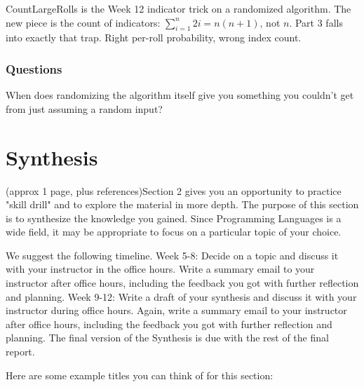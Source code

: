 \documentclass{article}
\theoremstyle{theorem}
\theoremstyle{definition}
\theoremstyle{remark}
\begin{document}
CountLargeRolls is the Week 12 indicator trick on a randomized algorithm. The new piece is the count of indicators: $\sum_{i=1}^{n} 2i = n(n+1)$, not $n$. Part 3 falls into exactly that trap. Right per-roll probability, wrong index count.

\subsubsection{Questions}

When does randomizing the algorithm itself give you something you couldn't get from just assuming a random input?
































\section{Synthesis}

(approx 1 page, plus references)Section 2 gives you an opportunity to practice "skill drill" and to explore the material in more depth. The purpose of this section is to synthesize the knowledge you gained. Since Programming Languages is a wide field, it may be appropriate to focus on a particular topic of your choice. 

We suggest the following timeline. Week 5-8: Decide on a topic and discuss it with your instructor in the office hours. Write a summary email to your instructor after office hours, including the feedback you got with further reflection and planning. Week 9-12: Write a draft of your synthesis and discuss it with your instructor during office hours. Again, write a summary email to your instructor after office hours, including the feedback you got with further reflection and planning. The final version of the Synthesis is due with the rest of the final report.

Here are some example titles you can think of for this section:
\end{document}
